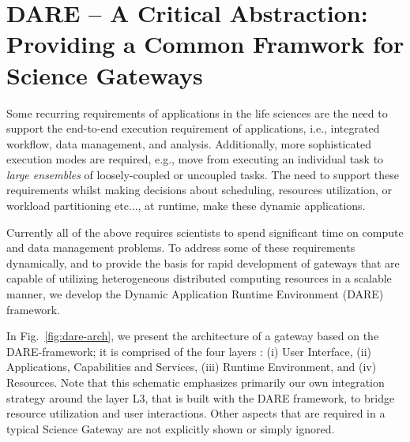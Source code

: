 \documentclass[]{svjour3}
\begin{document}



\section{DARE -- A Critical Abstraction: Providing a Common Framwork
  for Science Gateways}

Some recurring requirements of applications in the life sciences are
the need to support the end-to-end execution requirement of
applications, i.e., integrated workflow, data management, and
analysis. Additionally, more sophisticated execution modes are
required, e.g., move from executing an individual task to
\textit{large ensembles} of loosely-coupled or uncoupled tasks. The
need to support these requirements whilst making decisions about
scheduling, resources utilization, or workload partitioning etc..., at
runtime, make these dynamic applications.

Currently all of the above requires scientists to spend significant
time on compute and data management problems. To address some of
these requirements dynamically, and to provide the basis for
rapid development of gateways that are capable of utilizing
heterogeneous distributed computing resources in a scalable manner, we
develop the Dynamic Application Runtime Environment (DARE)
framework\cite{dareurl}.

In Fig.~\ref{fig:dare-arch}, we present the architecture of a gateway
based on the DARE-framework; it is comprised of the four layers : (i)
User Interface, (ii) Applications, Capabilities and Services, (iii)
Runtime Environment, and (iv) Resources. Note that this schematic
emphasizes primarily our own integration strategy around the layer 
L3, that is built with the DARE framework, to bridge resource
utilization and user interactions. Other aspects that
are required in a typical Science Gateway are not explicitly shown or
simply ignored.
\end{document}
